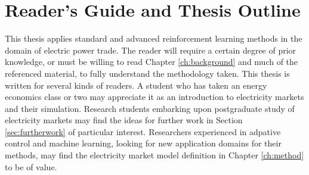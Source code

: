 

\section{Reader's Guide and Thesis Outline}
This thesis applies standard and advanced reinforcement learning methods in the
domain of electric power trade.  The reader will require a certain degree of
prior knowledge, or must be willing to read Chapter \ref{ch:background} and
much of the referenced material, to fully understand the methodology taken.
This thesis is written for several kinds of readers. A student who has taken an
energy economics class or two may appreciate it as an introduction to
electricity markets and their simulation.  Research students embarking upon
postgraduate study of electricity markets may find the ideas for further work
in Section \ref{sec:furtherwork} of particular interest.  Researchers
experienced in adpative control and machine learning, looking for new
application domains for their methods, may find the electricity market model
definition in Chapter \ref{ch:method} to be of value.

